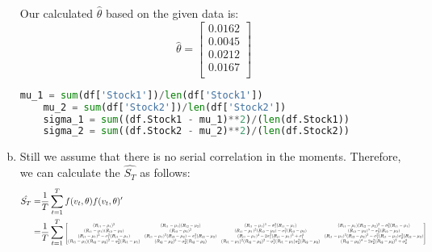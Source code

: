 \begin{enumerate}[(a)]
Our calculated $\hat{\theta}$ based on the given data is:
\begin{equation*}
  \hat{\theta} = \begin{bmatrix}
     0.0162 \\
     0.0045 \\
     0.0212 \\
     0.0167 \\
  \end{bmatrix}
\end{equation*}
\begin{center}
  \begin{lstlisting}[language=Python, caption=Python code for calculating $\hat{\theta}$, label={lst:q1a}, escapechar=|, frame=single, basicstyle=\small, showstringspaces=false, captionpos=b, breaklines=true, showspaces=false, showtabs=false, keywordstyle=\color{blue}, commentstyle=\color{gray}]
    mu_1 = sum(df['Stock1'])/len(df['Stock1'])
    mu_2 = sum(df['Stock2'])/len(df['Stock2'])
    sigma_1 = sum((df.Stock1 - mu_1)**2)/(len(df.Stock1))
    sigma_2 = sum((df.Stock2 - mu_2)**2)/(len(df.Stock2))
  \end{lstlisting}
\end{center}
\item Still we assume that there is no serial correlation in the moments. Therefore, we can calculate the $\hat{S_T}$ as follows:
\begin{equation*}
  \begin{aligned}
    \hat{S_T} = & \frac{1}{T} \sum_{t=1}^T f(v_t,\theta) f(v_t,\theta)'\\
    =& \frac{1}{T}\sum_{t=1}^T\scalemath{0.5}{ \begin{bmatrix}
      (R_{t1} - \mu_1)^2 & (R_{t1} - \mu_1)(R_{t2} - \mu_2) & (R_{t1} - \mu_1)^3 - \sigma_1^2(R_{t1} - \mu_1) & (R_{t1} - \mu_1)(R_{t2} - \mu_2)^2 - \sigma_2^2(R_{t1} - \mu_1)\\
      (R_{t1} - \mu_1)(R_{t2} - \mu_2) & (R_{t2} - \mu_2)^2 & (R_{t1} - \mu_1)^2(R_{t2} - \mu_2) - \sigma_1^2(R_{t2} - \mu_2) & (R_{t2} - \mu_2)^3 - \sigma_2^2(R_{t2} - \mu_2)\\
      (R_{t1} - \mu_1)^3 - \sigma_1^2(R_{t1} - \mu_1) & (R_{t1} - \mu_1)^2(R_{t2} - \mu_2) - \sigma_1^2(R_{t2} - \mu_2) & (R_{t1} - \mu_1)^4 - 2\sigma_1^2(R_{t1} - \mu_1)^2 + \sigma_1^4 & (R_{t1} - \mu_1)^2(R_{t2} - \mu_2)^2 - \sigma_1^2(R_{t1} - \mu_1)\sigma_2^2(R_{t2} - \mu_2)\\
      (R_{t1} - \mu_1)(R_{t2} - \mu_2)^2 - \sigma_2^2(R_{t1} - \mu_1) & (R_{t2} - \mu_2)^3 - \sigma_2^2(R_{t2} - \mu_2) & (R_{t1} - \mu_1)^2(R_{t2} - \mu_2)^2 - \sigma_1^2(R_{t1} - \mu_1)\sigma_2^2(R_{t2} - \mu_2) & (R_{t2} - \mu_2)^4 - 2\sigma_2^2(R_{t2} - \mu_2)^2 + \sigma_2^4\\

\end{bmatrix}}
\end{aligned}
\end{equation*}
\end{enumerate}
